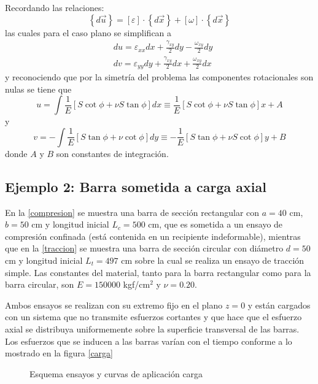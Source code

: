 \documentclass[../notas medios.tex]{subfiles}
\begin{document}
Recordando las relaciones:
\[\left\{ d\vec u \right\} = \left[ \varepsilon  \right] \cdot \left\{ d\vec x \right\} + \left[ \omega  \right] \cdot \left\{ d\vec x\right\}\]
las cuales para el caso plano se simplifican a
\begin{align*}
&du = \varepsilon_{xx}dx + \frac{\gamma_{xy}}{2}dy - \frac{\omega_{xy}}{2}dy\\
&dv = \varepsilon_{yy}dy + \frac{\gamma_{xy}}{2}dx + \frac{\omega_{xy}}{2}dx
\end{align*}
y reconociendo que por la simetría del problema las componentes rotacionales son nulas se tiene que
\[u = \int \frac{1}{E}[ S \cot\phi  + \nu S \tan\phi]dx  \equiv \frac{1}{E}[S \cot\phi  + \nu S \tan\phi]x + A\]
y
\[v =  - \int \frac{1}{E}[S \tan\phi  + \nu \cot\phi]dy  \equiv  - \frac{1}{E}[S \tan\phi  + \nu S \cot\phi]y + B\]
donde $A$ y $B$ son constantes de integración.


\subsection*{Ejemplo 2: Barra sometida a carga axial}

En la \cref{compresion} se muestra una barra de sección rectangular con $a= 40$ cm, $b = 50$ cm y longitud inicial $L_{c} = 500$ cm, que es  sometida a un ensayo de compresión confinada (está contenida en un recipiente indeformable), mientras que en la \cref{traccion}  se muestra una barra de sección circular con diámetro $d = 50$ cm y longitud inicial $L_{t} = 497$ cm sobre la cual se realiza  un ensayo de tracción simple. Las constantes del material, tanto para la barra rectangular como para la barra circular, son $E=150000$ kgf/cm$^2$ y $\nu=0.20$.

Ambos ensayos se realizan con su extremo fijo  en el plano $z = 0$ y están cargados con un sistema que no transmite esfuerzos cortantes y que hace que el esfuerzo axial se distribuya uniformemente sobre la superficie transversal de las barras. Los esfuerzos que se inducen a las barras varían con el tiempo conforme a lo mostrado en la figura \cref{carga}
\begin{figure}[H]
	\centering
	\caption{Esquema ensayos y curvas de aplicación carga}
	\label{ensayo}
\end{figure}
\end{document}

